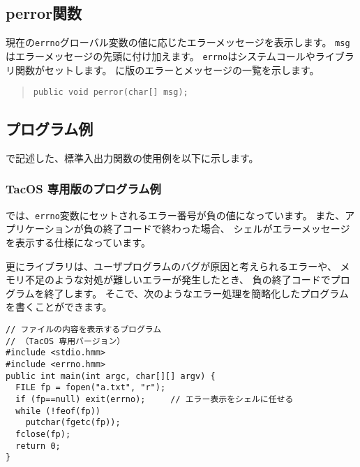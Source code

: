 \subsection{perror関数}

現在の\verb/errno/グローバル変数の値に応じたエラーメッセージを表示します。
\verb/msg/はエラーメッセージの先頭に付け加えます。
\verb/errno/はシステムコールやライブラリ関数がセットします。
に\tac 版のエラーとメッセージの一覧を示します。

\begin{quote}
\begin{verbatim}
public void perror(char[] msg);
\end{verbatim}
\end{quote}

\subsection{プログラム例}

\cmml で記述した、標準入出力関数の使用例を以下に示します。

\subsubsection{TacOS 専用版のプログラム例}

\tacos では、\verb/errno/変数にセットされるエラー番号が負の値になっています。
また、アプリケーションが負の終了コードで終わった場合、
シェルがエラーメッセージを表示する仕様になっています。

更にライブラリは、ユーザプログラムのバグが原因と考えられるエラーや、
メモリ不足のような対処が難しいエラーが発生したとき、
負の終了コードでプログラムを終了します。
そこで、次のようなエラー処理を簡略化したプログラムを書くことができます。


\begin{mylist}
\begin{verbatim}
// ファイルの内容を表示するプログラム
// （TacOS 専用バージョン）
#include <stdio.hmm>
#include <errno.hmm>
public int main(int argc, char[][] argv) {
  FILE fp = fopen("a.txt", "r");
  if (fp==null) exit(errno);     // エラー表示をシェルに任せる
  while (!feof(fp))
    putchar(fgetc(fp));
  fclose(fp);
  return 0;
}
\end{verbatim}
\end{mylist}

